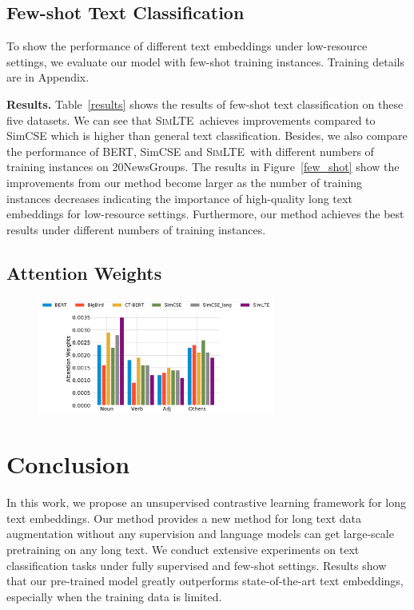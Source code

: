 \documentclass[11pt]{article}
\newcommand{\todo}[1]{{\color{red}{#1}}}
\newcommand{\our}{\mbox{\textsc{SimLTE}}}
\begin{document}
\subsection{Few-shot Text Classification}
To show the performance of different text embeddings under low-resource settings, we evaluate our model with few-shot training instances.
Training details are in Appendix.

\textbf{Results.} 
Table~\ref{results} shows the results of few-shot text classification on these five datasets. 
We can see that \our~achieves \todo{NUM} improvements compared to SimCSE which is higher than general text classification. 
Besides, we also compare the performance of BERT, SimCSE and \our~with different numbers of training instances on 20NewsGroups. 
The results in Figure~\ref{few_shot} show the improvements from our method become larger as the number of training instances decreases indicating the importance of high-quality long text embeddings for low-resource settings. 
Furthermore, our method achieves the best results under different numbers of training instances.

\subsection{Attention Weights}


\begin{figure}
\includegraphics[width=\columnwidth,height=1.5in]{fig/attentions.pdf}
\caption{
}  
\label{attentions}
\end{figure}

\section{Conclusion}
In this work, we propose an unsupervised contrastive learning framework for long text embeddings. 
Our method provides a new method for long text data augmentation without any supervision and language models can get large-scale pretraining on any long text. 
We conduct extensive experiments on text classification tasks under fully supervised and few-shot settings.
Results show that our pre-trained model greatly outperforms state-of-the-art text embeddings, especially when the training data is limited.
\end{document}
